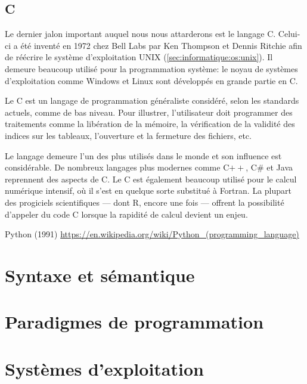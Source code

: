 \subsection{C}
\label{sec:informatique:historique:c}

Le dernier jalon important auquel nous nous attarderons est le langage
C. Celui-ci a été inventé en 1972 chez Bell Labs par Ken Thompson et
Dennis Ritchie afin de réécrire le système d'exploitation UNIX
(\autoref{sec:informatique:os:unix}). Il demeure beaucoup utilisé pour
la programmation système: le noyau de systèmes d'exploitation comme
Windows et Linux sont développés en grande partie en C.

Le C est un langage de programmation généraliste considéré, selon les
standards actuels, comme de bas niveau. Pour illustrer, l'utilisateur
doit programmer des traitements comme la libération de la mémoire, la
vérification de la validité des indices sur les tableaux, l'ouverture
et la fermeture des fichiers, etc.

Le langage demeure l'un des plus utilisés dans le monde et son
influence est considérable. De nombreux langages plus modernes comme
C$++$, C\# et Java reprennent des aspects de C. Le C est également
beaucoup utilisé pour le calcul numérique intensif, où il s'est en
quelque sorte substitué à Fortran. La plupart des progiciels
scientifiques --- dont R, encore une fois --- offrent la possibilité
d'appeler du code C lorsque la rapidité de calcul devient un enjeu.

\begin{figure}[t]
\end{figure}

Python (1991)
\url{https://en.wikipedia.org/wiki/Python_(programming_language)}






\section{Syntaxe et sémantique}
\label{sec:informatique:syntaxe}

\section{Paradigmes de programmation}
\label{sec:informatique:paradigmes}

\section{Systèmes d'exploitation}
\label{sec:informatique:os}



